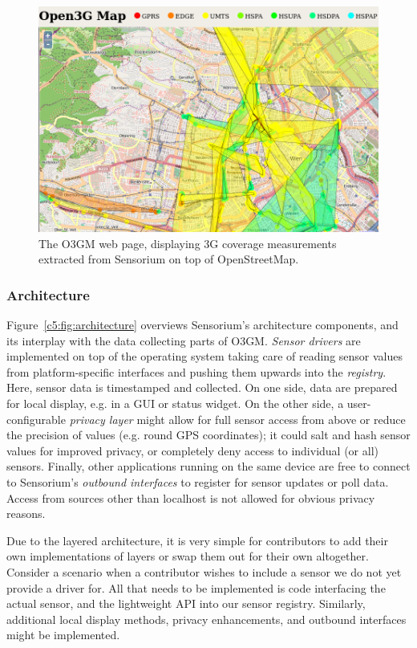 \begin{figure}[htbp]
\centering
\includegraphics[width=.98\columnwidth]{images/map-cells.png}
\caption{\small The O3GM web page, displaying 3G coverage measurements extracted from Sensorium on top of OpenStreetMap.}
\label{c5:fig:ogggm}
\end{figure}

\subsubsection{Architecture}

Figure~\ref{c5:fig:architecture} overviews Sensorium's architecture components, and its interplay with the data collecting parts of O3GM. \textit{Sensor drivers} are implemented on top of the operating system taking care of reading sensor values from platform-specific interfaces and pushing them upwards into the \textit{registry}. Here, sensor data is timestamped and collected. On one side, data are prepared for local display, e.g. in a GUI or status widget. On the other side, a user-configurable \textit{privacy layer} might allow for full sensor access from above or reduce the precision of values (e.g. round GPS coordinates); it could salt and hash sensor values for improved privacy, or completely deny access to individual (or all) sensors. Finally, other applications running on the same device are free to connect to Sensorium's \textit{outbound interfaces} to register for sensor updates or poll data. Access from sources other than localhost is not allowed for obvious privacy reasons.

Due to the layered architecture, it is very simple for contributors to add their own implementations of layers or swap them out for their own altogether. Consider a scenario when a contributor wishes to include a sensor we do not yet provide a driver for. All that needs to be implemented is code interfacing the actual sensor, and the lightweight API into our sensor registry. Similarly, additional local display methods, privacy enhancements, and outbound interfaces might be implemented.


